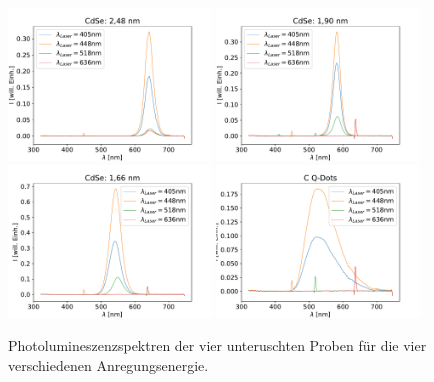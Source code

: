    \FloatBarrier

    \begin{figure}[h]
    \centering
    \includegraphics[width = 0.48\textwidth]{Probe_1_lambda.pdf}
    \includegraphics[width = 0.48\textwidth]{Probe_2_lambda.pdf}
    \includegraphics[width = 0.48\textwidth]{Probe_3_lambda.pdf}
    \includegraphics[width = 0.48\textwidth]{Probe_4_lambda.pdf}
    \caption{Photolumineszenzspektren der vier unteruschten Proben für die vier verschiedenen Anregungsenergie.}
    \label{fig:PLvsLambda}
    \end{figure}

    \FloatBarrier


